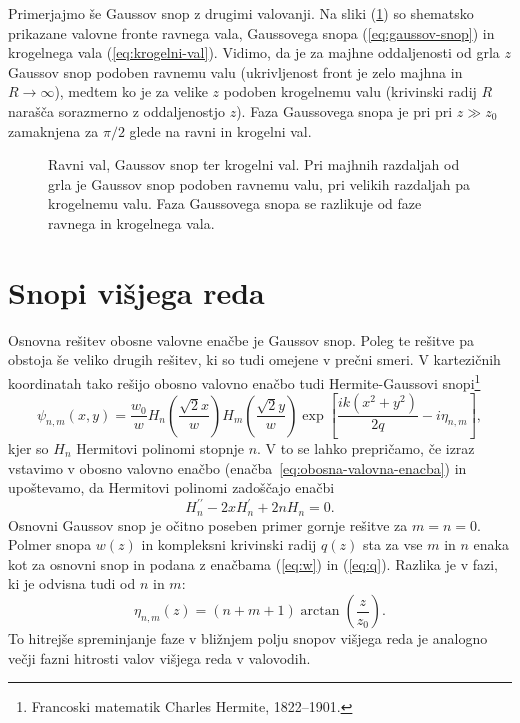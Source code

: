 Primerjajmo še Gaussov snop z drugimi valovanji. Na sliki (\ref{fig:ravni-Gaussov-krogelni-val}) 
so shematsko prikazane valovne fronte ravnega vala, Gaussovega snopa (\ref{eq:gaussov-snop}) in krogelnega
vala (\ref{eq:krogelni-val}). Vidimo, da je za majhne oddaljenosti od grla $z$ Gaussov
snop podoben ravnemu valu (ukrivljenost front je zelo majhna in $R \to \infty$), 
medtem ko je za velike $z$ podoben krogelnemu valu (krivinski radij $R$ narašča sorazmerno z oddaljenostjo $z$). 
Faza Gaussovega snopa je pri pri $z\gg z_{0}$ zamaknjena za $\pi/2$ glede na ravni in 
krogelni val. 

\begin{figure}[h]
\centering
\def\svgwidth{100truemm} 

\caption{Ravni val, Gaussov snop ter
krogelni val. Pri majhnih razdaljah od grla je Gaussov snop podoben
ravnemu valu, pri velikih razdaljah pa krogelnemu valu. Faza Gaussovega snopa
se razlikuje od faze ravnega in krogelnega vala.}
\label{fig:ravni-Gaussov-krogelni-val}
\end{figure}

\section{Snopi višjega reda}

Osnovna rešitev obosne valovne enačbe je Gaussov snop. Poleg te rešitve pa obstoja še veliko 
drugih rešitev, ki so tudi omejene v prečni smeri. V kartezičnih koordinatah tako rešijo obosno valovno enačbo
tudi Hermite-Gaussovi snopi\footnote{Francoski matematik Charles Hermite, 1822--1901.}
\begin{equation}
\psi_{n,m}(x,y)=\frac{w_{0}}{w}H_{n}\left(\frac{\sqrt{2}x}{w}\right)H_{m}\left(\frac{\sqrt{2}y}{w}\right)
\exp\left[\frac{ik(x^{2}+y^{2})}{2q}-i\eta_{n,m}\right],
\label{eq:Gauss-Hermitevi}
\end{equation}
kjer so $H_{n}$ Hermitovi polinomi stopnje $n$. V to se lahko
prepričamo, če izraz vstavimo v obosno valovno enačbo (enačba~\ref{eq:obosna-valovna-enacba}) in upoštevamo, 
da Hermitovi polinomi zadoščajo enačbi 
\begin{equation}
H_{n}^{\prime\prime}-2xH_{n}^{\prime}+2nH_{n}=0.
\end{equation}
Osnovni Gaussov snop je očitno poseben primer gornje rešitve za $m=n=0$.
Polmer snopa $w(z)$ in kompleksni krivinski radij $q(z)$ sta za
vse $m$ in $n$ enaka kot za osnovni snop in podana z enačbama (\ref{eq:w})
in (\ref{eq:q}). Razlika je v fazi, ki je odvisna tudi od $n$ in $m$: 
\begin{equation}
\eta_{n,m}\left(z\right)=(n+m+1)\arctan\left(\frac{z}{z_{0}}\right).
\end{equation}
To hitrejše spreminjanje faze v bližnjem polju snopov višjega reda
je analogno večji fazni hitrosti valov višjega reda v valovodih.

